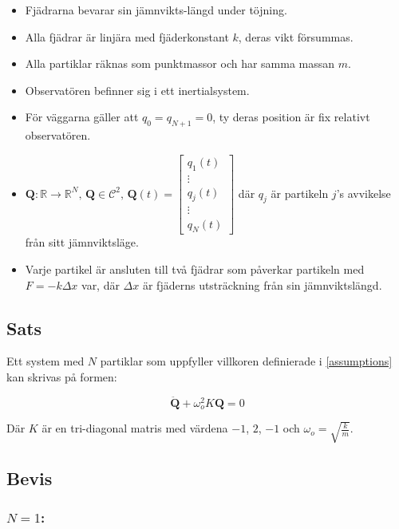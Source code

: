 \documentclass[12pt,a4paper]{article}
\newcommand{\R}{\ensuremath{\mathbb{R}}}
\begin{document}
\begin{appendix}
		\begin{itemize}
			\item Fjädrarna bevarar sin jämnvikts-längd under töjning.
			\item Alla fjädrar är linjära med fjäderkonstant $k$, deras vikt försummas.
			\item Alla partiklar räknas som punktmassor och har samma massan $m$.
			\item Observatören befinner sig i ett inertialsystem.
			\item För väggarna gäller att $q_0 = q_{N+1} = 0$, ty deras position är fix relativt observatören.
			\item $\mathbf{Q}: \R \rightarrow \R^N,\, \mathbf{Q} \in \mathcal{C}^2,\,\mathbf{Q}(t) = \begin{bmatrix}q_1(t) \\ \vdots \\ q_j(t) \\ \vdots \\ q_N(t) \end{bmatrix}$ där $q_j$ är
			      partikeln $j$'s avvikelse från sitt jämnviktsläge.
			\item Varje partikel är ansluten till två fjädrar som påverkar partikeln
			      med $F = -k \Delta x$ var, där $\Delta x$ är fjäderns utsträckning från sin jämnviktslängd.
		\end{itemize}
	
	
	\subsection{Sats}
		\label{sats}
		
		Ett system med $N$ partiklar som uppfyller villkoren definierade i \ref{assumptions} kan skrivas
		på formen:
		
		\begin{equation*}
			\mathbf{\ddot{Q}} + \omega_{o}^{2} K \mathbf{Q} = 0
		\end{equation*}
		
		Där $K$ är en tri-diagonal matris med värdena $-1$, $2$, $-1$ och $\omega_o = \sqrt{\frac{k}{m}}$.
		
	\newpage
	
	\subsection{Bevis}
		
	\subsubsection*{$N=1$:}
	

\end{appendix}
\end{document}
